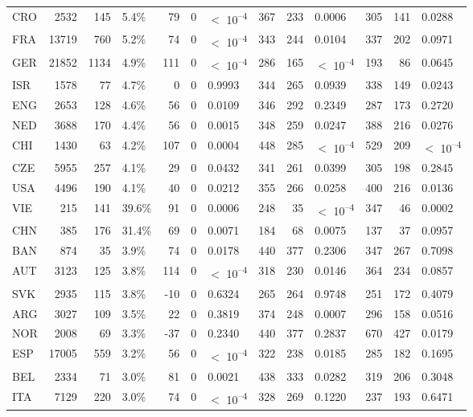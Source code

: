 \begin{tabular}[t]{lrrlrrlrrlrrl}
CRO & 2532 & 145 & 5.4\% & 79 & 0 & $<$ 10\textsuperscript{--4} & 367 & 233 & 0.0006 & 305 & 141 & 0.0288\\
FRA & 13719 & 760 & 5.2\% & 74 & 0 & $<$ 10\textsuperscript{--4} & 343 & 244 & 0.0104 & 337 & 202 & 0.0971\\
GER & 21852 & 1134 & 4.9\% & 111 & 0 & $<$ 10\textsuperscript{--4} & 286 & 165 & $<$ 10\textsuperscript{--4} & 193 & 86 & 0.0645\\
ISR & 1578 & 77 & 4.7\% & 0 & 0 & 0.9993 & 344 & 265 & 0.0939 & 338 & 149 & 0.0243\\
ENG & 2653 & 128 & 4.6\% & 56 & 0 & 0.0109 & 346 & 292 & 0.2349 & 287 & 173 & 0.2720\\
NED & 3688 & 170 & 4.4\% & 56 & 0 & 0.0015 & 348 & 259 & 0.0247 & 388 & 216 & 0.0276\\
CHI & 1430 & 63 & 4.2\% & 107 & 0 & 0.0004 & 448 & 285 & $<$ 10\textsuperscript{--4} & 529 & 209 & $<$ 10\textsuperscript{--4}\\
CZE & 5955 & 257 & 4.1\% & 29 & 0 & 0.0432 & 341 & 261 & 0.0399 & 305 & 198 & 0.2845\\
USA & 4496 & 190 & 4.1\% & 40 & 0 & 0.0212 & 355 & 266 & 0.0258 & 400 & 216 & 0.0136\\
VIE & 215 & 141 & 39.6\% & 91 & 0 & 0.0006 & 248 & 35 & $<$ 10\textsuperscript{--4} & 347 & 46 & 0.0002\\
CHN & 385 & 176 & 31.4\% & 69 & 0 & 0.0071 & 184 & 68 & 0.0075 & 137 & 37 & 0.0957\\
BAN & 874 & 35 & 3.9\% & 74 & 0 & 0.0178 & 440 & 377 & 0.2306 & 347 & 267 & 0.7098\\
AUT & 3123 & 125 & 3.8\% & 114 & 0 & $<$ 10\textsuperscript{--4} & 318 & 230 & 0.0146 & 364 & 234 & 0.0857\\
SVK & 2935 & 115 & 3.8\% & -10 & 0 & 0.6324 & 265 & 264 & 0.9748 & 251 & 172 & 0.4079\\
ARG & 3027 & 109 & 3.5\% & 22 & 0 & 0.3819 & 374 & 248 & 0.0007 & 296 & 158 & 0.0516\\
NOR & 2008 & 69 & 3.3\% & -37 & 0 & 0.2340 & 440 & 377 & 0.2837 & 670 & 427 & 0.0179\\
ESP & 17005 & 559 & 3.2\% & 56 & 0 & $<$ 10\textsuperscript{--4} & 322 & 238 & 0.0185 & 285 & 182 & 0.1695\\
BEL & 2334 & 71 & 3.0\% & 81 & 0 & 0.0021 & 438 & 333 & 0.0282 & 319 & 206 & 0.3048\\
ITA & 7129 & 220 & 3.0\% & 74 & 0 & $<$ 10\textsuperscript{--4} & 328 & 269 & 0.1220 & 237 & 193 & 0.6471\\

\end{tabular}
